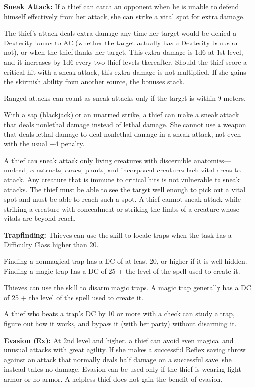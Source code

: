 \textbf{Sneak Attack:} If a thief can catch an opponent when he is unable to defend himself effectively from her attack, she can strike a vital spot for extra damage.

The thief's attack deals extra damage any time her target would be denied a Dexterity bonus to AC (whether the target actually has a Dexterity bonus or not), or when the thief flanks her target. This extra damage is 1d6 at 1st level, and it increases by 1d6 every two thief levels thereafter. Should the thief score a critical hit with a sneak attack, this extra damage is not multiplied. If she gains the skirmish ability from another source, the bonuses stack.

Ranged attacks can count as sneak attacks only if the target is within 9 meters.

With a sap (blackjack) or an unarmed strike, a thief can make a sneak attack that deals nonlethal damage instead of lethal damage. She cannot use a weapon that deals lethal damage to deal nonlethal damage in a sneak attack, not even with the usual $-4$ penalty.

A thief can sneak attack only living creatures with discernible anatomies---undead, constructs, oozes, plants, and incorporeal creatures lack vital areas to attack. Any creature that is immune to critical hits is not vulnerable to sneak attacks. The thief must be able to see the target well enough to pick out a vital spot and must be able to reach such a spot. A thief cannot sneak attack while striking a creature with concealment or striking the limbs of a creature whose vitals are beyond reach.

\textbf{Trapfinding:} Thieves can use the  skill to locate traps when the task has a Difficulty Class higher than 20.

Finding a nonmagical trap has a DC of at least 20, or higher if it is well hidden. Finding a magic trap has a DC of 25 + the level of the spell used to create it.

Thieves can use the  skill to disarm magic traps. A magic trap generally has a DC of 25 + the level of the spell used to create it.

A thief who beats a trap's DC by 10 or more with a  check can study a trap, figure out how it works, and bypass it (with her party) without disarming it.

\textbf{Evasion (Ex):} At 2nd level and higher, a thief can avoid even magical and unusual attacks with great agility. If she makes a successful Reflex saving throw against an attack that normally deals half damage on a successful save, she instead takes no damage. Evasion can be used only if the thief is wearing light armor or no armor. A helpless thief does not gain the benefit of evasion.

